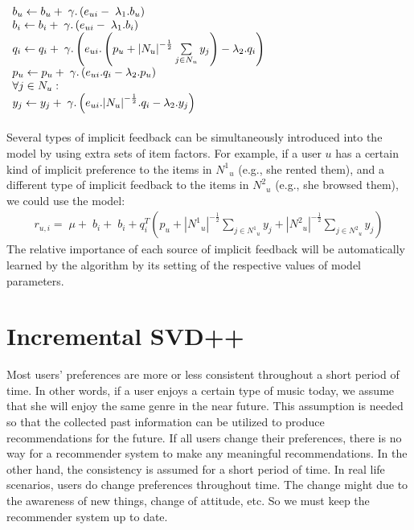 \documentclass[oneside,13pt]{extreport}
\begin{document}
$
\begin{array}{l}{b_u} \leftarrow {b_u} + {\rm{\;}}{\gamma}.\left( {{e_{ui}} - {\rm{\;}}{\lambda _1}.{b_u}} \right)\\{b_i} \leftarrow {b_i} + {\rm{\;}}{\gamma}.\left( {{e_{ui}} - {\rm{\;}}{\lambda _1}.{b_i}} \right)\\{q_i} \leftarrow {q_i} + {\rm{\;}}{\gamma}.\left( {{e_{ui}}.\left( {{p_u} + {{\left| {{N_u}} \right|}^{ - \frac{1}{2}}}\sum\limits_{j \in {N_u}} {{y_j}} } \right) - {\lambda _2}.{q_i}} \right)\\{p_u} \leftarrow {p_u} + {\rm{\;}}{\gamma}.\left( {{e_{ui}}.{q_i} - {\lambda _2}.{p_u}} \right)\\\forall j \in {N_u}:\\{y_j} \leftarrow {y_j} + {\rm{\;}}{\gamma}.\left( {{e_{ui}}.{{\left| {{N_u}} \right|}^{ - \frac{1}{2}}}.{q_i} - {\lambda _2}.{y_j}} \right)\end{array}
$
\\
\\
Several types of implicit feedback can be simultaneously introduced into the
model by using extra sets of item factors. For example, if a user $u$ has a certain
kind of implicit preference to the items in ${N^1}_u$ (e.g., she rented them), and a different
type of implicit feedback to the items in ${N^2}_u$ (e.g., she browsed them), we
could use the model: 
\begin{eqnarray}
\label{eq:svd++_pre2}
{r_{u,i}} = \;\mu  + \;{b_i} + \;{b_i} + q_i^T\left( {{p_u} + {{\left| {{N^1}_u} \right|}^{ - \frac{1}{2}}}\sum\limits_{j  \in {N^1}_u} {{y_j}}  + {{\left| {{N^2}_u} \right|}^{ - \frac{1}{2}}}\sum\limits_{j \in   {N^2}_u} {{y_j}} } \right)
\end{eqnarray}
The relative importance of each source of implicit feedback will be automatically
learned by the algorithm by its setting of the respective values of model parameters.
\section{Incremental SVD++}
Most users’ preferences are more or less consistent throughout a short period of time. In other words, if a user enjoys a certain type of music today, we assume that she will enjoy the same genre in the near future. This assumption is needed so that the collected past information can be utilized to produce recommendations for the future. If all users change their preferences, there is no way for a recommender
system to make any meaningful recommendations. In the other hand, the consistency is assumed for a short period of time. In real life scenarios, users do change preferences throughout time. The change might due to the awareness of new things, change of attitude, etc. So we must keep the recommender system up to date.
\end{document}
